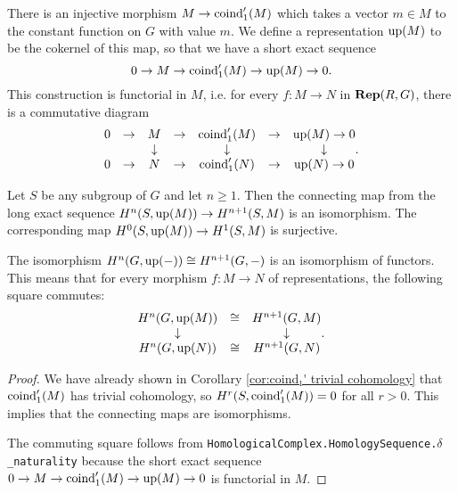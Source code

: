 \begin{definition} \label{def:up}
	There is an injective morphism $M \to \mathrm{coind}_1'(M)$ which takes a vector $m \in M$
	to the constant function on $G$ with value $m$.
	We define a representation $\mathrm{up}(M)$ to be the cokernel of this map, so that we have a short exact
	sequence
	\[
		0 \to M \to \mathrm{coind}_1'(M) \to \mathrm{up}(M) \to 0.
	\]
	This construction is functorial in $M$, i.e. for every $f : M \to N$ in $\mathbf{Rep}(R,G)$,
	there is a commutative diagram
	\[
		\begin{matrix}
			0 & \to& M & \to & \mathrm{coind}_1'(M) & \to& \mathrm{up}(M) \to 0 \\
			&&\downarrow &&\downarrow&&\downarrow \\
			0 & \to& N & \to & \mathrm{coind}_1'(N) & \to& \mathrm{up}(N) \to 0 \\
		\end{matrix}.
	\]
\end{definition}

\begin{corollary}	\label{cor:up iso}
		

	\leanok
	Let $S$ be any subgroup of $G$ and let $n \ge 1$.
	Then the connecting map from the long exact sequence $H^{n}(S,\mathrm{up}(M)) \to H^{n+1}(S,M)$ is an
	isomorphism.
	The corresponding map $H^{0}(S,\mathrm{up}(M)) \to H^{1}(S,M)$ is	surjective.

	The isomorphism $H^{n}(G,\mathrm{up}(-)) \cong H^{n+1}(G,-)$ is an isomorphism of functors.
	This means that for every morphism $f : M \to N$ of representations,
	the following square commutes:
	\[
		\begin{matrix}
			H^{n}(G,\mathrm{up}(M)) & \cong & H^{n+1}(G,M) \\
			\downarrow && \downarrow \\
			H^{n}(G,\mathrm{up}(N)) & \cong & H^{n+1}(G,N)
		\end{matrix}.
	\]
\end{corollary}

\begin{proof}
	We have already shown in Corollary \ref{cor:coind₁' trivial cohomology}
	that $\mathrm{coind}_1'(M)$ has trivial cohomology, so $H^{r}(S,\mathrm{coind}_1'(M))=0$
	for all $r>0$. This implies that the connecting maps are isomorphisms.

	The commuting square follows from
	\texttt{HomologicalComplex.HomologySequence.$\delta$\_naturality}
	because the short exact sequence $0 \to M \to \mathrm{coind}_1'(M) \to \mathrm{up}(M) \to 0$
	is functorial in $M$.
\end{proof}


